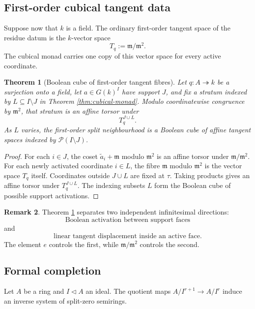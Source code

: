 \documentclass[11pt]{amsart}
\numberwithin{equation}{section}
\newtheorem{theorem}{Theorem}[section]
\theoremstyle{definition}
\newtheorem{remark}[theorem]{Remark}
\begin{document}
\subsection{First-order cubical tangent data}

Suppose now that $k$ is a field.  The ordinary first-order tangent space of the residue datum is the $k$-vector space
\[
T_q:=\mathfrak m/\mathfrak m^2.
\]
The cubical monad carries one copy of this vector space for every active coordinate.

\begin{theorem}[Boolean cube of first-order tangent fibres]\label{thm:first-order-cubical}
Let $q:A\twoheadrightarrow k$ be a surjection onto a field, let $a\in G(k)^I$ have support $J$, and fix a stratum indexed by $L\subseteq I\setminus J$ in Theorem \ref{thm:cubical-monad}.  Modulo coordinatewise congruence by $\mathfrak m^2$, that stratum is an affine torsor under
\[
T_q^{J\cup L}.
\]
As $L$ varies, the first-order split neighbourhood is a Boolean cube of affine tangent spaces indexed by $\mathcal P(I\setminus J)$.
\end{theorem}

\begin{proof}
For each $i\in J$, the coset $\widetilde a_i+\mathfrak m$ modulo $\mathfrak m^2$ is an affine torsor under $\mathfrak m/\mathfrak m^2$.  For each newly activated coordinate $i\in L$, the fibre $\mathfrak m$ modulo $\mathfrak m^2$ is the vector space $T_q$ itself.  Coordinates outside $J\cup L$ are fixed at $\tau$.  Taking products gives an affine torsor under $T_q^{J\cup L}$.  The indexing subsets $L$ form the Boolean cube of possible support activations.
\end{proof}

\begin{remark}
Theorem \ref{thm:first-order-cubical} separates two independent infinitesimal directions:
\[
\text{Boolean activation between support faces}
\]
and
\[
\text{linear tangent displacement inside an active face}.
\]
The element $e$ controls the first, while $\mathfrak m/\mathfrak m^2$ controls the second.
\end{remark}

\subsection{Formal completion}

Let $A$ be a ring and $I\triangleleft A$ an ideal.  The quotient maps $A/I^{r+1}\to A/I^r$ induce an inverse system of split-zero semirings.
\end{document}
